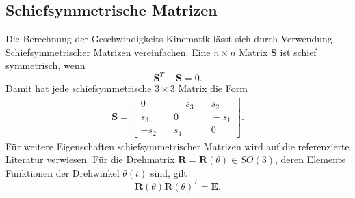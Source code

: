 \subsection{Schiefsymmetrische Matrizen}
Die Berechnung der Geschwindigkeits-Kinematik l{\"a}sst sich durch Verwendung Schiefsymmetrischer Matrizen vereinfachen. Eine $n\times n$ Matrix $\bm{S}$ ist schief symmetrisch, wenn 
\begin{equation}
	\label{eqn:skewsymmetric}
	\bm{S}^T+\bm{S}=0.
\end{equation}
Damit hat jede schiefsymmetrische $3\times3$ Matrix die Form
\begin{align}
	\bm{S} = \left[\begin{matrix}
		0 &\quad -s_3 &\quad s_2  \\
		s_3 &\quad 0 &\quad -s_1  \\
		-s_2 &\quad s_1 &\quad 0  
	\end{matrix}\right].
\end{align}
Für weitere Eigenschaften schiefsymmetrischer Matrizen wird auf die referenzierte Literatur \cite[S.~104]{Spong.2020} verwiesen. Für die Drehmatrix $\bm{R} = \bm{R}(\theta) \in SO(3)$, deren Elemente Funktionen der Drehwinkel $\theta\left(t\right)$ sind, gilt 
\begin{equation}
	\label{eqn:einheitsmatrix}
	\bm{R}(\theta)\bm{R}(\theta)^T = \bm{E}.
\end{equation}
%
